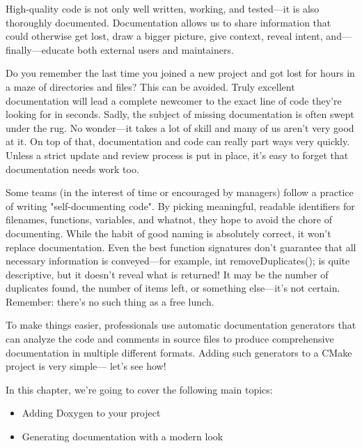 High-quality code is not only well written, working, and tested—it is also thoroughly documented. Documentation allows us to share information that could otherwise get lost, draw a bigger picture, give context, reveal intent, and—finally—educate both external users and maintainers.

Do you remember the last time you joined a new project and got lost for hours in a maze of directories and files? This can be avoided. Truly excellent documentation will lead a complete newcomer to the exact line of code they're looking for in seconds. Sadly, the subject of missing documentation is often swept under the rug. No wonder—it takes a lot of skill and many of us aren't very good at it. On top of that, documentation and code can really part ways very quickly. Unless a strict update and review process is put in place, it's easy to forget that documentation needs work too.

Some teams (in the interest of time or encouraged by managers) follow a practice of writing "self-documenting code". By picking meaningful, readable identifiers for filenames, functions, variables, and whatnot, they hope to avoid the chore of documenting. While the habit of good naming is absolutely correct, it won't replace documentation. Even the best function signatures don't guarantee that all necessary information is conveyed—for example, int removeDuplicates(); is quite descriptive, but it doesn't reveal what is returned! It may be the number of duplicates found, the number of items left, or something else—it's not certain. Remember: there's no such thing as a free lunch.

To make things easier, professionals use automatic documentation generators that can analyze the code and comments in source files to produce comprehensive documentation in multiple different formats. Adding such generators to a CMake project is very simple— let's see how!

In this chapter, we're going to cover the following main topics:

\begin{itemize}
\item 
Adding Doxygen to your project

\item 
Generating documentation with a modern look
\end{itemize}
